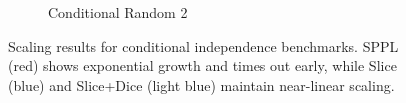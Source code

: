 \begin{figure}[!t]
\begin{subfigure}{0.32\textwidth}
\caption{Conditional Random 2}
\end{subfigure}
\caption{Scaling results for conditional independence benchmarks. SPPL (red) shows exponential growth and times out early, while Slice (blue) and Slice+Dice (light blue) maintain near-linear scaling.}
\label{fig:cond-benchmarks}
\end{figure}